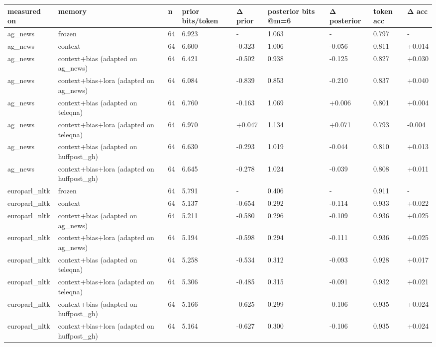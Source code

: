 \begin{tabular}{lllllllll}
\hline
measured on & memory & n & prior bits/token & Δ prior & posterior bits @m=6 & Δ posterior & token acc & Δ acc \\
\hline
ag\_news & frozen & 64 & 6.923 & - & 1.063 & - & 0.797 & - \\
ag\_news & context & 64 & 6.600 & -0.323 & 1.006 & -0.056 & 0.811 & +0.014 \\
ag\_news & context+bias (adapted on ag\_news) & 64 & 6.421 & -0.502 & 0.938 & -0.125 & 0.827 & +0.030 \\
ag\_news & context+bias+lora (adapted on ag\_news) & 64 & 6.084 & -0.839 & 0.853 & -0.210 & 0.837 & +0.040 \\
ag\_news & context+bias (adapted on teleqna) & 64 & 6.760 & -0.163 & 1.069 & +0.006 & 0.801 & +0.004 \\
ag\_news & context+bias+lora (adapted on teleqna) & 64 & 6.970 & +0.047 & 1.134 & +0.071 & 0.793 & -0.004 \\
ag\_news & context+bias (adapted on huffpost\_gh) & 64 & 6.630 & -0.293 & 1.019 & -0.044 & 0.810 & +0.013 \\
ag\_news & context+bias+lora (adapted on huffpost\_gh) & 64 & 6.645 & -0.278 & 1.024 & -0.039 & 0.808 & +0.011 \\
europarl\_nltk & frozen & 64 & 5.791 & - & 0.406 & - & 0.911 & - \\
europarl\_nltk & context & 64 & 5.137 & -0.654 & 0.292 & -0.114 & 0.933 & +0.022 \\
europarl\_nltk & context+bias (adapted on ag\_news) & 64 & 5.211 & -0.580 & 0.296 & -0.109 & 0.936 & +0.025 \\
europarl\_nltk & context+bias+lora (adapted on ag\_news) & 64 & 5.194 & -0.598 & 0.294 & -0.111 & 0.936 & +0.025 \\
europarl\_nltk & context+bias (adapted on teleqna) & 64 & 5.258 & -0.534 & 0.312 & -0.093 & 0.928 & +0.017 \\
europarl\_nltk & context+bias+lora (adapted on teleqna) & 64 & 5.306 & -0.485 & 0.315 & -0.091 & 0.932 & +0.021 \\
europarl\_nltk & context+bias (adapted on huffpost\_gh) & 64 & 5.166 & -0.625 & 0.299 & -0.106 & 0.935 & +0.024 \\
europarl\_nltk & context+bias+lora (adapted on huffpost\_gh) & 64 & 5.164 & -0.627 & 0.300 & -0.106 & 0.935 & +0.024 \\

\end{tabular}
